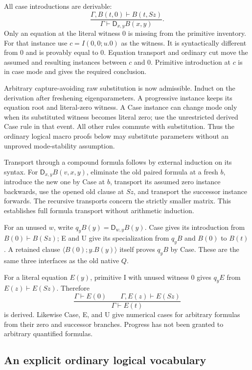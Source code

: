 \documentclass[11pt]{article}
\theoremstyle{definition}
\newcommand{\D}{\mathsf D}
\newcommand{\cl}[2]{\langle #1;#2\rangle}
\begin{document}
All case introductions are derivable:
\[
  \frac{\Gamma,B(t,0)\vdash B(t,Sz)}
       {\Gamma\vdash\D_{x,y}B(x,y)}.\tag{Case}
\]
Only an equation at the literal witness $0$ is missing from the primitive
inventory. For that instance use $c=I(0,0;u.0)$ as the witness. It is
syntactically different from $0$ and is provably equal to $0$.
Equation transport and ordinary cut move the assumed and resulting
instances between $c$ and $0$. Primitive introduction at $c$ is in case
mode and gives the required conclusion.

Arbitrary capture-avoiding raw substitution is now admissible. Induct on
the derivation after freshening eigenparameters. A progressive instance
keeps its equation root and literal-zero witness. A Case instance can
change mode only when its substituted witness becomes literal zero;
use the unrestricted derived Case rule in that event. All other rules
commute with substitution. Thus the ordinary logical macro proofs below
may substitute parameters without an unproved mode-stability assumption.

Transport through a compound formula follows by external induction on its
syntax. For $\D_{x,y}B(v,x,y)$, eliminate the old paired formula at a fresh
$b$, introduce the new one by Case at $b$, transport its assumed zero
instance backwards, use the opened old clause at $Sz$, and transport the
successor instance forwards. The recursive transports concern the strictly
smaller matrix. This establishes full formula transport without arithmetic
induction.

For an unused $w$, write $q_yB(y)=\D_{w,y}B(y)$. Case gives its introduction
from $B(0)\vdash B(Sz)$; E and U give its specialization from $q_yB$ and
$B(0)$ to $B(t)$. A retained clause $\cl{B(0)}{y.B(y)}$ itself proves
$q_yB$ by Case. These are the same three interfaces as the old native $Q$.

For a literal equation $E(y)$, primitive I with unused witness $0$ gives
$q_yE$ from $E(z)\vdash E(Sz)$. Therefore
\[
 \frac{\Gamma\vdash E(0)\qquad\Gamma,E(z)\vdash E(Sz)}
      {\Gamma\vdash E(t)}\tag{EI}
\]
is derived. Likewise Case, E, and U give numerical cases for arbitrary
formulas from their zero and successor branches. Progress has not been
granted to arbitrary quantified formulas.

\subsection{An explicit ordinary logical vocabulary}
\end{document}
